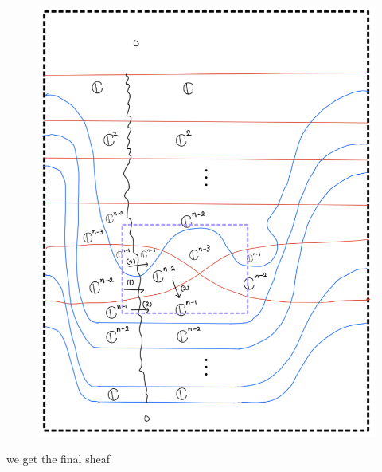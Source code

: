 \begin{enumerate}[label = (\roman*)]
\begin{enumerate}[label = (Case \arabic*)]
\begin{enumerate}[label = (Step \arabic*)]
\begin{figure}[H]
    \centering
    \includegraphics[scale = 0.95]{diagrams/cobord_gen/18.png}
    \caption{}
    \label{fig:your-label}
\end{figure}
\pagebreak
we get the final sheaf


\end{enumerate}
\end{enumerate}
\end{enumerate}
